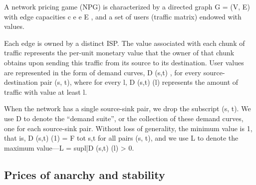 \documentclass{beamer}
\begin{document}
\begin{frame}
A network pricing game (NPG) is characterized by a directed graph G = (V, E)
with edge capacities {c e } e E , and a set of users (traffic matrix) endowed with
values.

Each edge is owned by a distinct ISP. The value associated with each chunk of traffic represents the per-unit monetary value that
the owner of that chunk obtains upon sending this traffic from its source to its
destination. User values are represented in the form of demand curves, D (s,t) ,
for every source-destination pair (s, t), where for every l, D (s,t) (l) represents the
amount of traffic with value at least l.

When the network has a single source-sink
pair, we drop the subscript (s, t). We use D to denote the “demand suite”, or
the collection of these demand curves, one for each source-sink pair. Without
loss of generality, the minimum value is 1, that is, D (s,t) (1) = F tot
s,t for all pairs
(s, t), and we use L to denote the maximum value—L = sup{l|D (s,t) (l) > 0}.
\end{frame}



\subsection{Prices of anarchy and stability}
\end{document}
